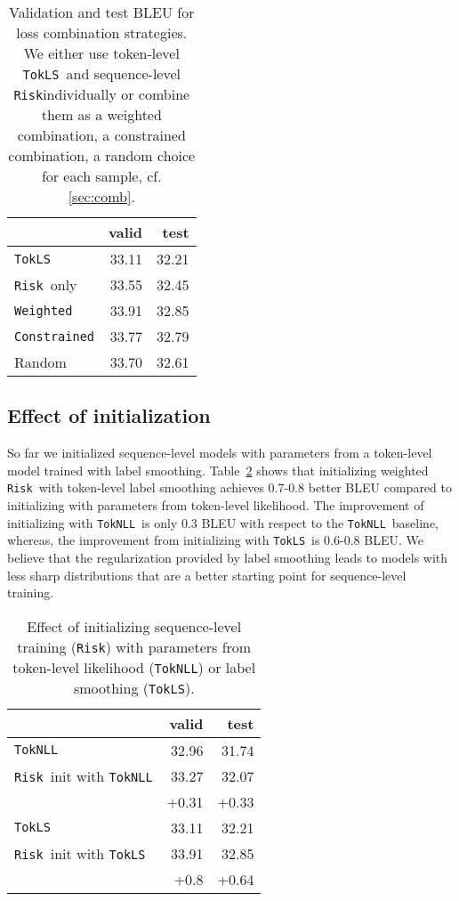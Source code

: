 \documentclass[11pt,a4paper]{article}
\newcommand{\TokNLL}{\texttt{TokNLL}}
\newcommand{\TokLS}{\texttt{TokLS}}
\newcommand{\Risk}{\texttt{Risk}}
\newcommand{\Constrained}{\texttt{Constrained}}
\newcommand{\Weighted}{\texttt{Weighted}}
\begin{document}
\begin{table}[t]
\centering
\begin{tabular}{lrr}
\toprule
& \bf valid & \bf test \\ \midrule
\TokLS & 33.11 & 32.21 \\
\Risk~only & 33.55 & 32.45 \\ \midrule
\Weighted & 33.91 & 32.85 \\
\Constrained & 33.77 & 32.79 \\
Random & 33.70 & 32.61 \\
\bottomrule
\end{tabular}
\caption{Validation and test BLEU for loss combination strategies. We either use token-level
\TokLS~and sequence-level \Risk individually or combine them
as a weighted combination, a constrained combination, a random choice for each sample, cf. \textsection\ref{sec:comb}.
}
\label{tab:combresults}
\end{table}


\subsection{Effect of initialization}
\label{sec:results_init}

So far we initialized sequence-level models with parameters from a token-level model trained with label smoothing. Table~\ref{tab:results_init} shows that initializing weighted \Risk~with token-level label smoothing achieves 0.7-0.8 better BLEU compared to initializing with parameters from token-level likelihood.
The improvement of initializing with \TokNLL~is only 0.3 BLEU with respect to the \TokNLL~baseline, whereas, the improvement from initializing with \TokLS~is 0.6-0.8 BLEU.
We believe that the regularization provided by label smoothing leads to models with less sharp distributions that are a better starting point for sequence-level training.

\begin{table}
\centering
\begin{tabular}{lrr}
\toprule
& \bf valid & \bf test \\ \midrule
\TokNLL & 32.96 & 31.74 \\
\Risk~init with \TokNLL & 33.27 & 32.07 \\
 & +0.31 & +0.33 \\ \midrule
\TokLS & 33.11 & 32.21 \\
\Risk~init with \TokLS & 33.91 & 32.85 \\
 & +0.8 & +0.64 \\
\bottomrule
\end{tabular}
\caption{Effect of initializing sequence-level training (\Risk) with parameters from token-level likelihood (\TokNLL) or label smoothing (\TokLS).
}
\label{tab:results_init}
\end{table}
\end{document}
